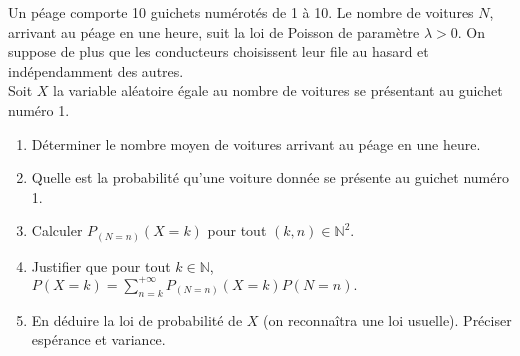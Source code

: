 \documentclass[a4paper,10pt]{report}
\begin{document}
\begin{Exercice}{} Un péage comporte 10 guichets numérotés de 1 à 10. Le nombre de voitures $N$, arrivant au péage en une heure, suit la loi de Poisson de paramètre $\lambda>0$. On suppose de plus que les conducteurs choisissent leur file au hasard et indépendamment des autres.\\
Soit $X$ la variable aléatoire égale au nombre de voitures se présentant au guichet numéro 1.
\begin{enumerate}
\item Déterminer le nombre moyen de voitures arrivant au péage en une heure.
\item Quelle est la probabilité qu'une voiture donnée se présente au guichet numéro 1.
\item Calculer $P_{(N=n)}(X=k)$ pour tout $(k,n) \in \mathbb{N}^2$.
\item Justifier que pour tout $k \in \mathbb{N}$, $\displaystyle{P(X=k)=\sum_{n=k}^{+\infty}P_{(N=n)}(X=k) P(N=n).}$
\item En déduire la loi de probabilité de $X$ (on reconnaîtra une loi usuelle). Préciser espérance et variance.
\end{enumerate}
\end{Exercice}

\corr 
\end{document}
